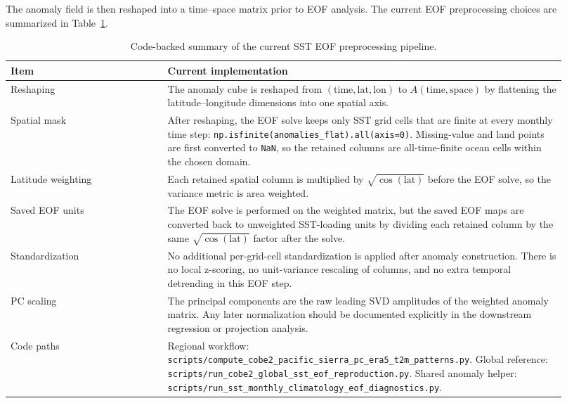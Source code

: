 \documentclass[11pt]{article}
\begin{document}
The anomaly field is then reshaped into a time--space matrix prior to EOF analysis.
The current EOF preprocessing choices are summarized in Table~\ref{tab:eof_preprocessing}.

\begin{table}[h]
\centering
\begin{tabular}{>{\raggedright\arraybackslash}p{0.26\linewidth} >{\raggedright\arraybackslash}p{0.66\linewidth}}
\toprule
Item & Current implementation \\
\midrule
Reshaping &
The anomaly cube is reshaped from $(\mathrm{time},\mathrm{lat},\mathrm{lon})$ to
$A(\mathrm{time},\mathrm{space})$ by flattening the latitude--longitude dimensions into one spatial axis. \\
Spatial mask &
After reshaping, the EOF solve keeps only SST grid cells that are finite at every monthly time step:
\texttt{np.isfinite(anomalies\_flat).all(axis=0)}. Missing-value and land points are first converted to
\texttt{NaN}, so the retained columns are all-time-finite ocean cells within the chosen domain. \\
Latitude weighting &
Each retained spatial column is multiplied by $\sqrt{\cos(\mathrm{lat})}$ before the EOF solve, so the
variance metric is area weighted. \\
Saved EOF units &
The EOF solve is performed on the weighted matrix, but the saved EOF maps are converted back to
unweighted SST-loading units by dividing each retained column by the same
$\sqrt{\cos(\mathrm{lat})}$ factor after the solve. \\
Standardization &
No additional per-grid-cell standardization is applied after anomaly construction. There is no local
z-scoring, no unit-variance rescaling of columns, and no extra temporal detrending in this EOF step. \\
PC scaling &
The principal components are the raw leading SVD amplitudes of the weighted anomaly matrix. Any later
normalization should be documented explicitly in the downstream regression or projection analysis. \\
Code paths &
Regional workflow:
\texttt{scripts/compute\_cobe2\_pacific\_sierra\_pc\_era5\_t2m\_patterns.py}. Global reference:
\texttt{scripts/run\_cobe2\_global\_sst\_eof\_reproduction.py}. Shared anomaly helper:
\texttt{scripts/run\_sst\_monthly\_climatology\_eof\_diagnostics.py}. \\
\bottomrule
\end{tabular}
\caption{Code-backed summary of the current SST EOF preprocessing pipeline.}
\label{tab:eof_preprocessing}
\end{table}
\end{document}
